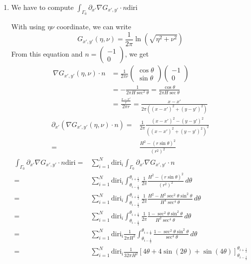 \documentclass[a4paper,12pt]{article}
\newcommand{\integ}[3]{%
\ensuremath{\displaystyle{\int^{#2}_{#1} #3}}}
\begin{document}
\begin{enumerate}
\item We have to compute $\integ{\Gamma_0}{}{\partial_{x'}\nabla G_{x',y'} \cdot n \text{diri}}$

With using $\eta\nu$ coordinate, we can write
\begin{equation}
 G_{x',y'}(\eta,\nu)=\frac{1}{2\pi} \ln \left(\sqrt{\eta^2+\nu^2}\right)
\end{equation}
From this equation and $n=\left(\begin{array}{c}
      -1 \\
      0
    \end{array}\right)$, we get
\begin{align}
 \nabla G_{x',y'}(\eta,\nu) \cdot n&=\frac{1}{2\pi r} \left(\begin{array}{c}
      \cos\theta \\
      \sin \theta
    \end{array}\right) 
    \left(\begin{array}{c}
      -1 \\
      0
    \end{array}\right)\\
    &=-\frac{1}{2\pi H \sec^2\theta} =\frac{\cos \theta}{2\pi H \sec \theta}\\
    &=\frac{\frac{x-x'}{r}}{2 \pi r}=\frac{x-x'}{2 \pi \left((x-x')^2+(y-y')^2\right)}\label{NablaGn}
\end{align}
\begin{align}
 \partial_{x'}\left( \nabla G_{x',y'}(\eta,\nu) \cdot n \right)=&\frac{1}{2\pi} \frac{(x-x')^2-(y-y')^2}{\left((x-x')^2+(y-y')^2 \right)^2}\\
 =& \frac{H^2-(r\sin \theta)^2}{(r^2)^2}
\end{align}
\begin{align}
 \integ{\Gamma_0}{}{\partial_{x'}\nabla G_{x',y'} \cdot n \text{diri}}=& \sum\limits_{i=1}^N \text{diri}_i \integ{\Gamma_0}{}{\partial_{x'}\nabla G_{x',y'} \cdot n}\\
 =& \sum\limits_{i=1}^N \text{diri}_i \integ{\theta_{i-\frac{1}{2}}}{\theta_{i+\frac{1}{2}}}{\frac{1}{2\pi} \frac{H^2-(r\sin\theta)^2}{\left(r^2\right)^2} \, d\theta}\\
=&\sum\limits_{i=1}^N \text{diri}_i \integ{\theta_{i-\frac{1}{2}}}{\theta_{i+\frac{1}{2}}}{\frac{1}{2\pi} \frac{H^2-H^2 \sec^2\theta \sin^2\theta}{H^4\sec^4\theta} \, d\theta}\\
=&\sum\limits_{i=1}^N \text{diri}_i \integ{\theta_{i-\frac{1}{2}}}{\theta_{i+\frac{1}{2}}}{\frac{1}{2\pi} \frac{1-\sec^2\theta \sin^2\theta}{H^2 \sec^4\theta} \, d\theta}\\
=&\sum\limits_{i=1}^N \text{diri}_i \frac{1}{2\pi H^2} \integ{\theta_{i-\frac{1}{2}}}{\theta_{i+\frac{1}{2}}}{\frac{1-\sec^2\theta \sin^2\theta}{\sec^4\theta} \, d\theta}\\
=& \sum\limits_{i=1}^N \text{diri}_i \frac{1}{32\pi H^2} \left[4\theta + 4 \sin(2\theta) + \sin (4\theta) \right]_{\theta_{i-\frac{1}{2}}}^{\theta_{i+\frac{1}{2}}}\label{intPartialNablaGn}
\end{align}
\end{enumerate}
\end{document}
